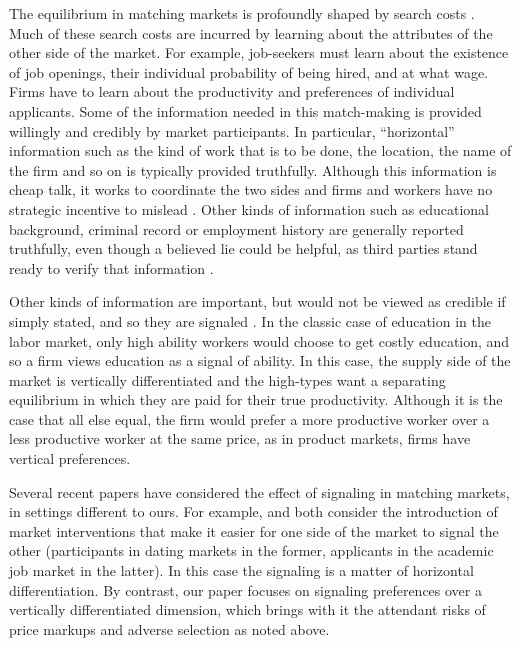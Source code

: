 The equilibrium in matching markets is profoundly shaped by search costs \citep{rogerson2005search}.
Much of these search costs are incurred by learning about the attributes of the other side of the market.
For example, job-seekers must learn about the existence of job openings, their individual probability of being hired, and at what wage.
Firms have to learn about the productivity and preferences of individual applicants. 
Some of the information needed in this match-making is provided willingly and credibly by market participants.
In particular, ``horizontal'' information such as the kind of work that is to be done, the location, the name of the firm and so on is typically provided truthfully.
Although this information is cheap talk, it works to coordinate the two sides and firms and workers have no strategic incentive to mislead \citep{farrell1996cheap}.
Other kinds of information such as educational background, criminal record or employment history are generally reported truthfully, even though a believed lie could be helpful, as third parties stand ready to verify that information \citep{autor2008economics}. 

Other kinds of information are important, but would not be viewed as credible if simply stated, and so they are signaled \citep{spence1973job}.  
In the classic case of education in the labor market, only high ability workers would choose to get costly education, and so a firm views education as a signal of ability.
In this case, the supply side of the market is vertically differentiated and the high-types want a separating equilibrium in which they are paid for their true productivity. 
Although it is the case that all else equal, the firm would prefer a more productive worker over a less productive worker at the same price, as in product markets, firms have vertical preferences.

Several recent papers have considered the effect of signaling in matching markets, in settings different to ours.
For example, \cite{lee2011propose} and \cite{coles2013preference} both consider the introduction of market interventions that make it easier for one side of the market to signal the other (participants in dating markets in the former, applicants in the academic job market in the latter).
In this case the signaling is a matter of horizontal differentiation.
By contrast, our paper focuses on signaling preferences over a vertically differentiated dimension, which brings with it the attendant risks of price markups and adverse selection as noted above.  

